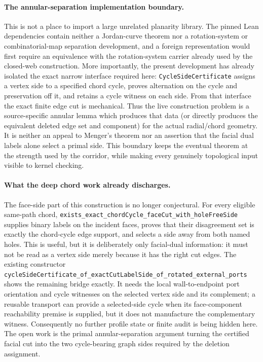 \documentclass[11pt]{article}
\theoremstyle{definition}
\begin{document}
\paragraph{The annular-separation implementation boundary.}  This is not a
place to import a large unrelated planarity library.  The pinned Lean
dependencies contain neither a Jordan-curve theorem nor a rotation-system or
combinatorial-map separation development, and a foreign representation would
first require an equivalence with the rotation-system carrier already used by
the closed-web construction.  More importantly, the present development has
already isolated the exact narrow interface required here:
\texttt{CycleSideCertificate} assigns a vertex side to a specified chord
cycle, proves alternation on the cycle and preservation off it, and retains a
cycle witness on each side.  From that interface the exact finite edge cut is
mechanical.  Thus the live construction problem is a source-specific annular
lemma which produces that data (or directly produces the equivalent deleted
edge set and component) for the actual radial/chord geometry.  It is neither
an appeal to Menger's theorem nor an assertion that the facial dual labels
alone select a primal side.  This boundary keeps the eventual theorem at the
strength used by the corridor, while making every genuinely topological input
visible to kernel checking.

\paragraph{What the deep chord work already discharges.}  The face-side
part of this construction is no longer conjectural.  For every eligible
same-path chord,
\texttt{exists\_exact\_chordCycle\_faceCut\_with\_holeFreeSide} supplies
binary labels on the incident faces, proves that their disagreement set is
exactly the chord-cycle edge support, and selects a side away from both named
holes.  This is useful, but it is deliberately only facial-dual information:
it must not be read as a vertex side merely because it has the right cut
edges.  The existing constructor
\texttt{cycleSideCertificate\_of\_exactCutLabelSide\_of\_rotated\_external\_ports}
shows the remaining bridge exactly.  It needs the local wall-to-endpoint port
orientation and cycle witnesses on the selected vertex side and its
complement; a reusable transport can provide a selected-side cycle when its
face-component reachability premise is supplied, but it does not manufacture
the complementary witness.  Consequently no further profile state or finite
audit is being hidden here.  The open work is the primal annular-separation
argument turning the certified facial cut into the two cycle-bearing graph
sides required by the deletion assignment.
\end{document}
